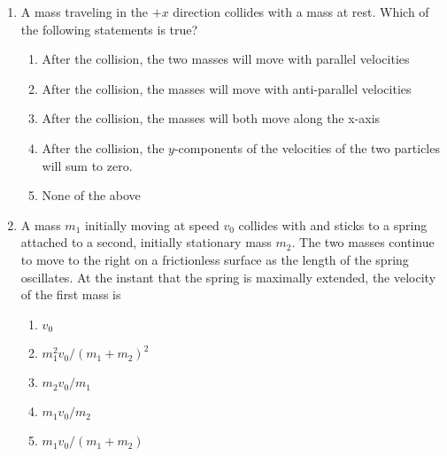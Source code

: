 \documentclass{../../../oss-apphys}
\begin{document}
\begin{multicols}{2}
\begin{enumerate}[resume,leftmargin=18pt]
  \item A mass traveling in the $+x$ direction collides with a mass at rest.
    Which of the following statements is true?
    \begin{enumerate}[nosep,leftmargin=18pt,label=(\Alph*)]
    \item After the collision, the two masses will move with parallel velocities
    \item After the collision, the masses will move with anti-parallel
      velocities
    \item After the collision, the masses will both move along the x-axis
    \item After the collision, the $y$-components of the velocities of the two
      particles will sum to zero.
    \item None of the above
    \end{enumerate}
    \columnbreak
    
  \item A mass $m_1$ initially moving at speed $v_0$ collides with and sticks
    to a spring attached to a second, initially stationary mass $m_2$. The two
    masses continue to move to the right on a frictionless surface as the
    length of the spring oscillates. At the instant that the spring is
    maximally extended, the velocity of the first mass is
    \begin{center}
    \end{center}
    \begin{enumerate}[nosep,leftmargin=18pt,label=(\Alph*)]
    \item $v_0$
    \item $m_1^2v_0/(m_1+m_2)^2$
    \item $m_2v_0/m_1$
    \item $m_1v_0/m_2$
    \item $m_1v_0/(m_1+m_2)$
    \end{enumerate}


\end{enumerate}
\end{multicols}
\end{document}
